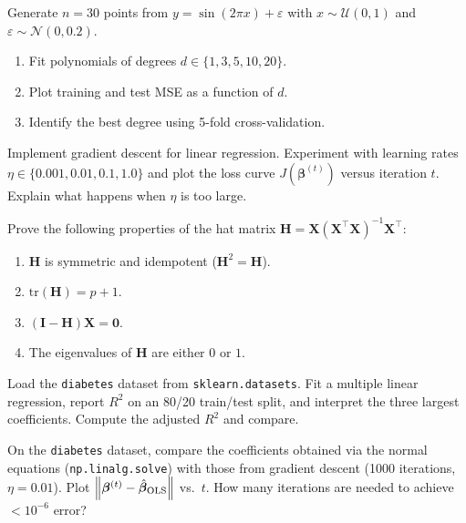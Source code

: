 \begin{exercise}
Generate $n=30$ points from $y = \sin(2\pi x) + \varepsilon$ with $x \sim \mathcal{U}(0,1)$ and $\varepsilon \sim \mathcal{N}(0,0.2)$.
\begin{enumerate}
    \item Fit polynomials of degrees $d \in \{1, 3, 5, 10, 20\}$.
    \item Plot training and test MSE as a function of $d$.
    \item Identify the best degree using 5-fold cross-validation.
\end{enumerate}
\end{exercise}

\begin{exercise}
Implement gradient descent for linear regression. Experiment with learning rates $\eta \in \{0.001, 0.01, 0.1, 1.0\}$ and plot the loss curve $J(\bm{\beta}^{(t)})$ versus iteration $t$. Explain what happens when $\eta$ is too large.
\end{exercise}

\begin{exercise}
Prove the following properties of the hat matrix $\bm{H} = \bm{X}(\bm{X}^\top\bm{X})^{-1}\bm{X}^\top$:
\begin{enumerate}
    \item $\bm{H}$ is symmetric and idempotent ($\bm{H}^2 = \bm{H}$).
    \item $\text{tr}(\bm{H}) = p + 1$.
    \item $(\bm{I} - \bm{H})\bm{X} = \bm{0}$.
    \item The eigenvalues of $\bm{H}$ are either $0$ or $1$.
\end{enumerate}
\end{exercise}

\begin{exercise}
Load the \texttt{diabetes} dataset from \texttt{sklearn.datasets}. Fit a multiple linear regression, report $R^2$ on an 80/20 train/test split, and interpret the three largest coefficients. Compute the adjusted $R^2$ and compare.
\end{exercise}

\begin{exercise}
On the \texttt{diabetes} dataset, compare the coefficients obtained via the normal equations (\texttt{np.linalg.solve}) with those from gradient descent (1000 iterations, $\eta=0.01$). Plot $\left\| \bm{\beta}^{(t)} - \hat{\bm{\beta}}_{\text{OLS}} \right\|$ vs.\ $t$. How many iterations are needed to achieve $<10^{-6}$ error?
\end{exercise}


